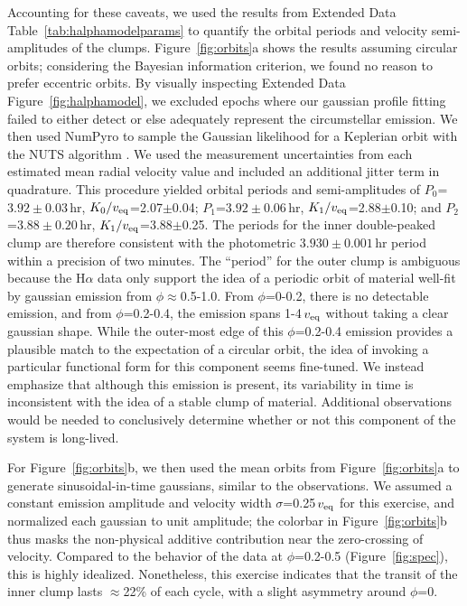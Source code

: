 \documentclass{nature3}
\begin{document}
\begin{methods}
Accounting for these caveats, we used the results from Extended Data
Table~\ref{tab:halphamodelparams} to quantify the orbital periods and
velocity semi-amplitudes of the clumps.  Figure~\ref{fig:orbits}a
shows the results assuming circular orbits; considering the Bayesian
information criterion, we found no reason to prefer eccentric orbits.
By visually inspecting Extended Data Figure~\ref{fig:halphamodel}, we
excluded epochs where our gaussian profile fitting failed to either
detect or else adequately represent the circumstellar emission.  We
then used NumPyro to sample the Gaussian likelihood for a Keplerian
orbit with the NUTS algorithm \cite{Phan2019}.  We used the
measurement uncertainties from each estimated mean radial velocity
value and included an additional jitter term in quadrature.  This
procedure yielded orbital periods and semi-amplitudes of
$P_0$=$3.92\pm0.03$\,hr, $K_0/v_{\rm eq}$=2.07$\pm$0.04;
$P_1$=$3.92\pm0.06$\,hr, $K_1/v_{\rm eq}$=2.88$\pm$0.10;
and $P_2$=$3.88\pm0.20$\,hr, $K_1/v_{\rm eq}$=3.88$\pm$0.25.
The periods for the inner double-peaked clump are therefore consistent
with the photometric $3.930\pm0.001$\,hr period within a precision of
two minutes.  The ``period'' for the outer clump is ambiguous because
the H$\alpha$ data only support the idea of a periodic orbit of
material well-fit by gaussian emission from $\phi$$\approx$0.5-1.0.
From $\phi$=0-0.2, there is no detectable emission, and from
$\phi$=0.2-0.4, the emission spans 1-4\,$v_{\rm eq}$ without taking a
clear gaussian shape.  While the outer-most edge of this
$\phi$=0.2-0.4 emission provides a plausible match to the expectation
of a circular orbit, the idea of invoking a particular functional form
for this component seems fine-tuned.  We instead emphasize that
although this emission is present, its variability in time is
inconsistent with the idea of a stable clump of material.  Additional
observations would be needed to conclusively determine whether or not
this component of the system is long-lived.

For Figure~\ref{fig:orbits}b, we then used the mean orbits from
Figure~\ref{fig:orbits}a to generate sinusoidal-in-time gaussians,
similar to the observations.  We assumed a constant emission amplitude
and velocity width $\sigma$=0.25\,$v_{\rm eq}$ for this exercise, and
normalized each gaussian to unit amplitude;  the colorbar in
Figure~\ref{fig:orbits}b thus masks the non-physical additive
contribution near the zero-crossing of velocity.  Compared to the
behavior of the data at $\phi$=0.2-0.5 (Figure~\ref{fig:spec}), this
is highly idealized.  Nonetheless, this exercise indicates that the
transit of the inner clump lasts $\approx$22\% of each cycle, with a
slight asymmetry around $\phi$=0.


\end{methods}
\end{document}
